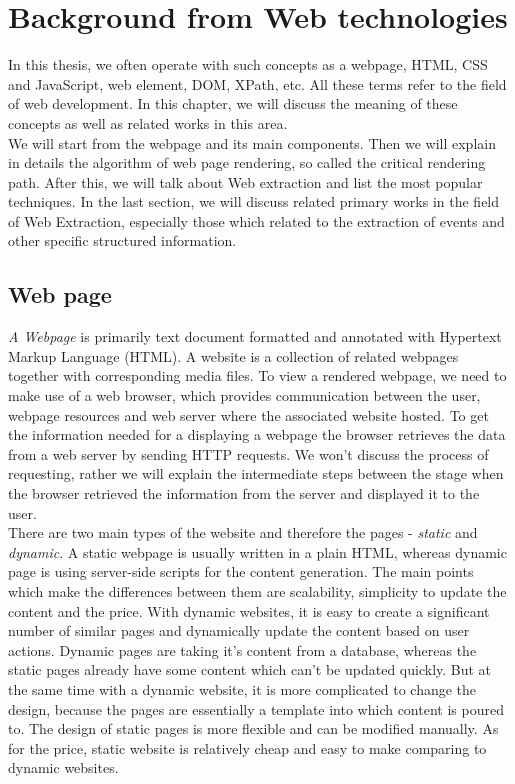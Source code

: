 \chapter{Background from Web technologies}
\label{chap:background}

In this thesis, we often operate with such concepts as a webpage, HTML, CSS and JavaScript, web element, DOM, XPath, etc. All these terms refer to the field of web development. In this chapter, we will discuss the meaning of these concepts as well as related works in this area.\\

We will start from the webpage and its main components. Then we will explain in details the algorithm of web page rendering, so called the critical rendering path. After this, we will talk about Web extraction and list the most popular techniques. In the last section, we will discuss related primary works in the field of Web Extraction, especially those which related to the extraction of events and other specific structured information.\\

\section{Web page}
\textit{A Webpage} is primarily text document formatted and annotated with Hypertext Markup Language (HTML). A website is a collection of related webpages together with corresponding media files. To view a rendered webpage, we need to make use of a web browser, which provides communication between the user, webpage resources and web server where the associated website hosted. To get the information needed for a displaying a webpage the browser retrieves the data from a web server by sending HTTP requests. We won't discuss the process of requesting, rather we will explain the intermediate steps between the stage when the browser retrieved the information from the server and displayed it to the user.\\ 

There are two main types of the website and therefore the pages - \textit{static} and \textit{dynamic}. A static webpage is usually written in a plain HTML, whereas dynamic page is using server-side scripts for the content generation. The main points which make the differences between them are scalability, simplicity to update the content and the price. With dynamic websites, it is easy to create a significant number of similar pages and dynamically update the content based on user actions. Dynamic pages are taking it's content from a database, whereas the static pages already have some content which can't be updated quickly. But at the same time with a dynamic website, it is more complicated to change the design, because the pages are essentially a template into which content is poured to. The design of static pages is more flexible and can be modified manually. As for the price, static website is relatively cheap and easy to make comparing to dynamic websites.\\ 

